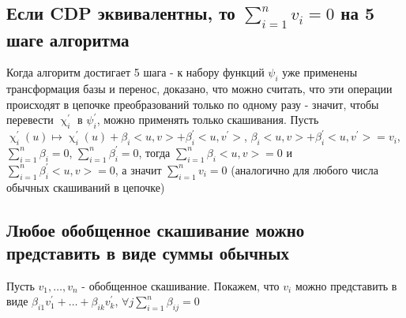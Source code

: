 \documentclass[16pt]{article}
\theoremstyle{definition}
\begin{document}
\subsection{Если CDP эквивалентны, то $\sum_{i=1}^n v_i = 0$ на 5 шаге алгоритма}
Когда алгоритм достигает 5 шага - к набору функций $\psi_i$ уже применены трансформация базы и перенос, доказано, что можно считать, что эти операции происходят в цепочке преобразований только по одному разу - значит, чтобы перевести $\upchi^{'}_i$ в $\psi^{'}_i$, можно применять только скашивания. 
Пусть $\upchi^{'}_i(u) \mapsto \upchi^{'}_i(u) + \beta_i<u, v> + \beta_i^{'}<u, v^{'}>$, 
$\beta_i<u, v> + \beta_i^{'}<u, v^{'}> = v_i$, 
$\sum_{i=1}^{n} \beta_i = 0$, 
$\sum_{i=1}^{n} \beta^{'}_i = 0$, 
тогда $\sum_{i=1}^{n} \beta_i<u, v>= 0$ и $\sum_{i=1}^{n} \beta^{'}_i<u, v>= 0$, 
а значит $\sum_{i=1}^{n} v_i = 0$ (аналогично для любого числа обычных скашиваний в цепочке)
\subsection{Любое обобщенное скашивание можно представить в виде суммы обычных}
Пусть $v_1, \dots, v_n$ - обобщенное скашивание. Покажем, что $v_i$ можно представить в виде $\beta_{i1}v^{'}_1 + \dots + \beta_{ik}v^{'}_k$, $\forall j \sum_{i=1}^n\beta_{ij} = 0 $
\\
\def\vf{
\begin{bmatrix}
    a_{11} \\
    a_{21} \\
    \vdots \\
    a_{m1}
\end{bmatrix}}

\def\vs{
\begin{bmatrix}
    a_{12} \\
    a_{22} \\
    \vdots \\
    a_{m2}
\end{bmatrix}}

\def\vn{
\begin{bmatrix}
    a_{1n} \\
    a_{2n} \\
    \vdots \\
    a_{mn}
\end{bmatrix}}

\def\basef{
\begin{bmatrix}
    1 \\
    0 \\
    0 \\
    \vdots \\
    0
\end{bmatrix}}
\end{document}
